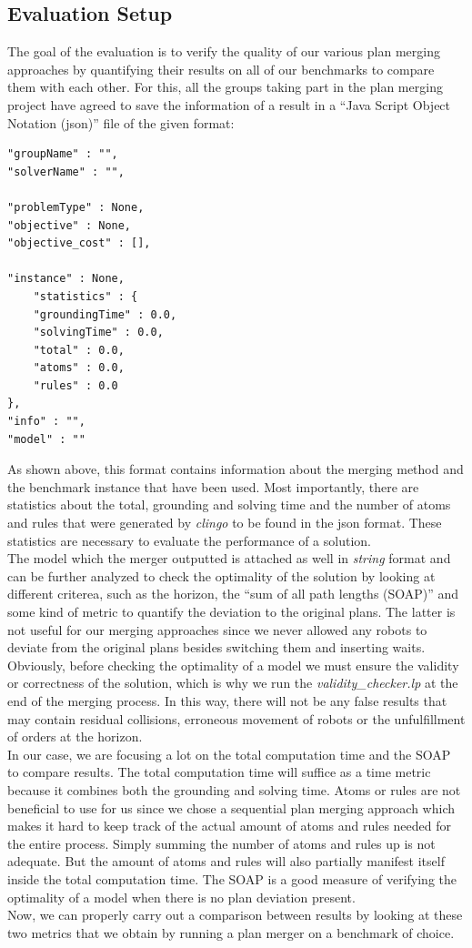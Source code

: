 \documentclass{llncs}
\begin{document}
\subsection{Evaluation Setup}
The goal of the evaluation is to verify the quality of our various plan merging approaches by quantifying their results on all of our benchmarks to compare them with each other.
For this, all the groups taking part in the plan merging project have agreed to save the information of a result in a ``Java Script Object Notation (json)'' file of the given format:

\begin{verbatim}
"groupName" : "",
"solverName" : "",

"problemType" : None,
"objective" : None,
"objective_cost" : [],

"instance" : None,
	"statistics" : {
	"groundingTime" : 0.0,
	"solvingTime" : 0.0,
	"total" : 0.0,
	"atoms" : 0.0,
	"rules" : 0.0
},
"info" : "",
"model" : ""
\end{verbatim}

As shown above, this format contains information about the merging method and the benchmark instance that have been used. Most importantly, there are statistics about the total, grounding and solving time and the number of atoms and rules that were generated by \emph{clingo}\cite{clingo} to be found in the json format. These statistics are necessary to evaluate the performance of a solution.\\
The model which the merger outputted is attached as well in \emph{string} format and can be further analyzed to check the optimality of the solution by looking at different criterea, such as the horizon, the ``sum of all path lengths (SOAP)'' and some kind of metric to quantify the deviation to the original plans.
The latter is not useful for our merging approaches since we never allowed any robots to deviate from the original plans besides switching them and inserting waits. Obviously, before checking the optimality of a model we must ensure the validity or correctness of the solution, which is why we run the \emph{validity\_checker.lp}\cite{project1} at the end of the merging process. In this way, there will not be any false results that may contain residual collisions, erroneous movement of robots or the unfulfillment of orders at the horizon.\\
In our case, we are focusing a lot on the total computation time and the SOAP to compare results.
The total computation time will suffice as a time metric because it combines both the grounding and solving time. Atoms or rules are not beneficial to use for us since we chose a sequential plan merging approach which makes it hard to keep track of the actual amount of atoms and rules needed for the entire process. Simply summing the number of atoms and rules up is not adequate. But the amount of atoms and rules will also partially manifest itself inside the total computation time.
The SOAP is a good measure of verifying the optimality of a model when there is no plan deviation present.\\
Now, we can properly carry out a comparison between results by looking at these two metrics that we obtain by running a plan merger on a benchmark of choice.
\end{document}
